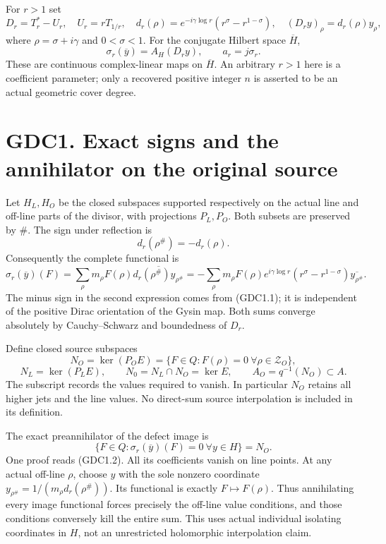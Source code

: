 For \(r>1\) set \[
D_r=T_r^*-U_r,\quad U_r=rT_{1/r},\quad
d_r(\rho)=e^{-i\gamma\log r}(r^\sigma-r^{1-\sigma}),
\quad(D_ry)_\rho=d_r(\rho)y_\rho,
\tag{GDC0.4}
\] where \(\rho=\sigma+i\gamma\) and \(0<\sigma<1\). For the conjugate
Hilbert space \(\overline H\), \[
\sigma_r(\overline y)=A_H(D_ry),\qquad a_r=j\sigma_r.
\tag{GDC0.5}
\] These are continuous complex-linear maps on \(\overline H\). An
arbitrary \(r>1\) here is a coefficient parameter; only a recovered
positive integer \(n\) is asserted to be an actual geometric cover
degree.

\section{GDC1. Exact signs and the annihilator on the original
source}\label{gdc1.-exact-signs-and-the-annihilator-on-the-original-source}

Let \(H_L,H_O\) be the closed subspaces supported respectively on the
actual line and off-line parts of the divisor, with projections
\(P_L,P_O\). Both subsets are preserved by \(\#\). The sign under
reflection is \[
d_r(\rho^\#)=-d_r(\rho).
\tag{GDC1.1}
\] Consequently the complete functional is \[
\sigma_r(\overline y)(F)
=\sum_\rho m_\rho F(\rho)
 \overline{d_r(\rho^\#)y_{\rho^\#}}
=-\sum_\rho m_\rho F(\rho)e^{i\gamma\log r}
 (r^\sigma-r^{1-\sigma})\overline{y_{\rho^\#}}.
\tag{GDC1.2}
\] The minus sign in the second expression comes from (GDC1.1); it is
independent of the positive Dirac orientation of the Gysin map. Both
sums converge absolutely by Cauchy--Schwarz and boundedness of \(D_r\).

Define closed source subspaces \[
N_O=\ker(P_OE)=\{F\in Q:F(\rho)=0\ \forall\rho\in\mathscr Z_O\},
\] \[
N_L=\ker(P_LE),\qquad N_0=N_L\cap N_O=\ker E,
\qquad A_O=q^{-1}(N_O)\subset A.
\tag{GDC1.3}
\] The subscript records the values required to vanish. In particular
\(N_O\) retains all higher jets and the line values. No direct-sum
source interpolation is included in its definition.

The exact preannihilator of the defect image is \[
\boxed{\{F\in Q:\sigma_r(\overline y)(F)=0\ \forall y\in H\}=N_O.}
\tag{GDC1.4}
\] One proof reads (GDC1.2). All its coefficients vanish on line points.
At any actual off-line \(\rho\), choose \(y\) with the sole nonzero
coordinate \(y_{\rho^\#}=1/(m_\rho d_r(\rho^\#))\). Its functional is
exactly \(F\mapsto F(\rho)\). Thus annihilating every image functional
forces precisely the off-line value conditions, and those conditions
conversely kill the entire sum. This uses actual individual isolating
coordinates in \(H\), not an unrestricted holomorphic interpolation
claim.

